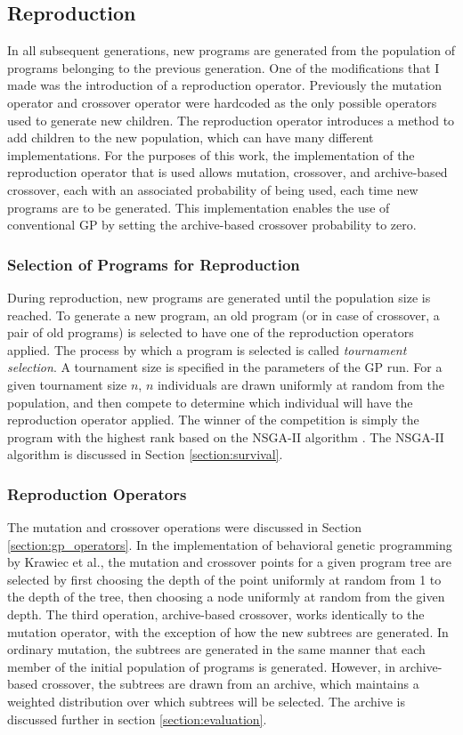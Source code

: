 \subsection{Reproduction}
In all subsequent generations, new programs are generated from the population of programs belonging to the previous generation.  One of the modifications that I made was the introduction of a reproduction operator.  Previously the mutation operator and crossover operator were hardcoded as the only possible operators used to generate new children.  The reproduction operator introduces a method to add children to the new population, which can have many different implementations.  For the purposes of this work, the implementation of the reproduction operator that is used allows mutation, crossover, and archive-based crossover, each with an associated probability of being used, each time new programs are to be generated.  This implementation enables the use of conventional GP by setting the archive-based crossover probability to zero.

\subsubsection{Selection of Programs for Reproduction}
During reproduction, new programs are generated until the population size is reached.  To generate a new program, an old program (or in case of crossover, a pair of old programs) is selected to have one of the reproduction operators applied.  The process by which a program is selected is called \textit{tournament selection}.  A tournament size is specified in the parameters of the GP run.  For a given tournament size $n$, $n$ individuals are drawn uniformly at random from the population, and then compete to determine which individual will have the reproduction operator applied.  The winner of the competition is simply the program with the highest rank based on the NSGA-II algorithm \cite{nsga}.  The NSGA-II algorithm is discussed in Section \ref{section:survival}.

\subsubsection{Reproduction Operators}
The mutation and crossover operations were discussed in Section \ref{section:gp_operators}.  In the implementation of behavioral genetic programming by Krawiec et al., the mutation and crossover points for a given program tree are selected by first choosing the depth of the point uniformly at random from 1 to the depth of the tree, then choosing a node uniformly at random from the given depth.  The third operation, archive-based crossover, works identically to the mutation operator, with the exception of how the new subtrees are generated.  In ordinary mutation, the subtrees are generated in the same manner that each member of the initial population of programs is generated.  However, in archive-based crossover, the subtrees are drawn from an archive, which maintains a weighted distribution over which subtrees will be selected.  The archive is discussed further in section \ref{section:evaluation}.

